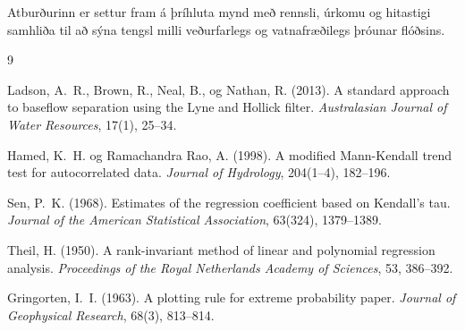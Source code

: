 \documentclass[12pt, a4paper]{article}
\begin{document}
Atburðurinn er settur fram á þríhluta mynd með rennsli, úrkomu og hitastigi
samhliða til að sýna tengsl milli veðurfarlegs og vatnafræðilegs þróunar
flóðsins.

\begin{thebibliography}{9}

Ladson, A.~R., Brown, R., Neal, B., og Nathan, R. (2013).
A standard approach to baseflow separation using the Lyne and Hollick filter.
\textit{Australasian Journal of Water Resources}, 17(1), 25--34.

Hamed, K.~H. og Ramachandra Rao, A. (1998).
A modified Mann-Kendall trend test for autocorrelated data.
\textit{Journal of Hydrology}, 204(1--4), 182--196.

Sen, P.~K. (1968).
Estimates of the regression coefficient based on Kendall's tau.
\textit{Journal of the American Statistical Association}, 63(324), 1379--1389.

Theil, H. (1950).
A rank-invariant method of linear and polynomial regression analysis.
\textit{Proceedings of the Royal Netherlands Academy of Sciences}, 53, 386--392.

Gringorten, I.~I. (1963).
A plotting rule for extreme probability paper.
\textit{Journal of Geophysical Research}, 68(3), 813--814.

\end{thebibliography}
\end{document}
